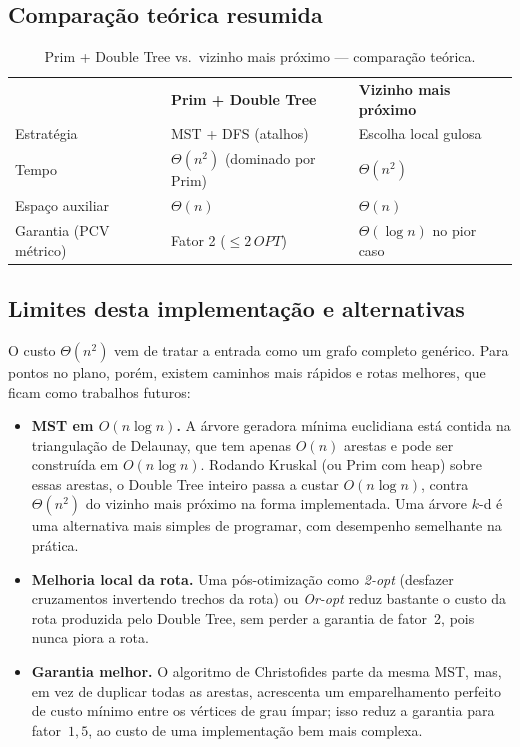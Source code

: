 \documentclass[11pt,a4paper]{article}
\newcommand{\cab}[1]{\leavevmode\color{white}\bfseries #1}
\newcommand{\fioCabecalho}{\arrayrulecolor{tabFio}\specialrule{1.2pt}{0pt}{0pt}\arrayrulecolor{eachTeal}}
\renewcommand{\_}{\underscoreoriginal\allowbreak}
\begin{document}
\subsection{Comparação teórica resumida}

\begin{table}[H]
\centering
\caption{Prim + Double Tree vs.\ vizinho mais próximo --- comparação teórica.}
\label{tab:teorica}
\begin{tabular}{l l l}
\toprule
\rowcolor{tabCabecalho}
 & \cab{Prim + Double Tree} & \cab{Vizinho mais próximo}\\
\fioCabecalho
Estratégia & MST + DFS (atalhos) & Escolha local gulosa\\
Tempo & $\Theta(n^2)$ (dominado por Prim) & $\Theta(n^2)$\\
Espaço auxiliar & $\Theta(n)$ & $\Theta(n)$\\
Garantia (PCV métrico) & Fator 2 ($\leq 2\,OPT$) & $\Theta(\log n)$ no pior caso\\
\bottomrule
\end{tabular}
\end{table}

\subsection{Limites desta implementação e alternativas}
\label{sec:alternativas}

O custo $\Theta(n^2)$ vem de tratar a entrada como um grafo completo
genérico. Para pontos no plano, porém, existem caminhos mais rápidos e
rotas melhores, que ficam como trabalhos futuros:

\begin{itemize}
  \item \textbf{MST em $O(n\log n)$.} A árvore geradora mínima
    euclidiana está contida na triangulação de Delaunay, que tem apenas
    $O(n)$ arestas e pode ser construída em $O(n\log n)$. Rodando
    Kruskal (ou Prim com heap) sobre essas arestas, o Double Tree
    inteiro passa a custar $O(n\log n)$, contra $\Theta(n^2)$ do
    vizinho mais próximo na forma implementada. Uma árvore $k$-d é uma
    alternativa mais simples de programar, com desempenho semelhante na
    prática.
  \item \textbf{Melhoria local da rota.} Uma pós-otimização como
    \emph{2-opt} (desfazer cruzamentos invertendo trechos da rota) ou
    \emph{Or-opt} reduz bastante o custo da rota produzida pelo Double
    Tree, sem perder a garantia de fator~2, pois nunca piora a rota.
  \item \textbf{Garantia melhor.} O algoritmo de Christofides parte da
    mesma MST, mas, em vez de duplicar todas as arestas, acrescenta um
    emparelhamento perfeito de custo mínimo entre os vértices de grau
    ímpar; isso reduz a garantia para fator~$1{,}5$, ao custo de uma
    implementação bem mais complexa.
\end{itemize}
\end{document}
